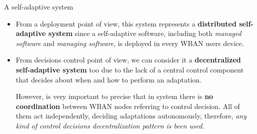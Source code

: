 \documentclass[10pt]{beamer}
\begin{document}
\begin{frame}{A self-adaptive system} 

\begin{itemize}

\item From a deployment point of view, this system represents a \textbf{distributed self-adaptive system} since a self-adaptive software, including both \textit{managed software} and \textit{managing software}, is deployed in every WBAN users device.\cite{PatternsDecentralizedSelf}

\item From decisions control point of view, we can consider it a \textbf{decentralized self-adaptive system} too due to the lack of a central control component that decides about when and how to perform an adaptation.\cite{PatternsDecentralizedSelf} 

However, is very important to precise that in \citet{MSAReport} system there is \textbf{no coordination} between WBAN nodes referring to control decision. All  of them act independently, deciding adaptations autonomously, therefore, \textit{any kind of control decisions decentralization pattern is been used}. 

\end{itemize}

\end{frame} 
\end{document}
